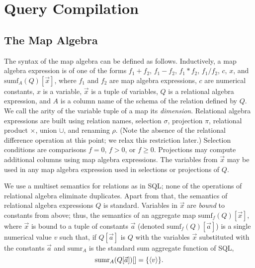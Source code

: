 \section{Query Compilation}


\def\algsum{\mathrm{sum}}
\def\algagg{\mathrm{agg}}
\def\algtop{\mathrm{top}}
\def\algtopk{\mathrm{topk}}






\subsection{The Map Algebra}


\def\algsumr{\mbox{sumr}}
\def\algsumf{\mbox{sumf}}
\def\distinct{\mbox{dnct}}
\def\routerjoin{\bowtie\!=}



The syntax of the map algebra can be defined as follows.
Inductively, a map algebra expression is of one of the forms $f_1 + f_2$,
$f_1 - f_2$, $f_1 * f_2$, $f_1 / f_2$, $c$, $x$, and $\algsumf_A(Q)[\vec{x}]$,
where $f_1$ and $f_2$ are map algebra expressions, $c$ are numerical constants,
$x$ is a variable, $\vec{x}$ is a tuple of variables, $Q$ is a relational algebra
expression, and $A$ is a column name of the schema of the relation defined by $Q$.
We call the arity of the variable tuple of a map its {\em dimension}\/.
Relational algebra expressions are built using relation names,
selection $\sigma$, projection $\pi$, relational product $\times$, union $\cup$,
and renaming $\rho$. (Note the absence of the relational difference operation
at this point; we
relax this restriction later.) Selection conditions are comparisons
$f = 0$, $f > 0$, or $f \ge 0$.
Projections may compute additional columns
using map algebra expressions. 
The variables from $\vec{x}$ may be used in
any map algebra expression used in selections or projections of $Q$.

We use a multiset semantics for relations as in SQL; none of the operations
of relational algebra eliminate duplicates.
Apart from that, the semantics of relational algebra expressions $Q$ is standard.
Variables
in $\vec{x}$ are {\em bound}\/ to constants from above; thus, the semantics of an
aggregate map $\algsumf_f(Q)[\vec{x}]$, where $\vec{x}$ is bound to a tuple of
constants $\vec{a}$
(denoted $\algsumf_f(Q)[\vec{a}]$) is a single numerical value $v$ such that, if
$Q[\vec{a}]$ is $Q$ with the variables $\vec{x}$ substituted with the constants
$\vec{a}$ and $\algsumr_A$ is the standard sum aggregate function of SQL,
\[
\algsumr_A(Q[\vec{a}])[] = \{ \tuple{v} \}.
\]


